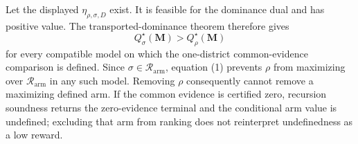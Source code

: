 Let the displayed \(\eta_{\rho,\sigma,D}\) exist. It is feasible for the dominance dual and has positive value. The transported-dominance theorem therefore gives
\[
Q_\sigma^\star(\mathbf M)>Q_\rho^\star(\mathbf M)\tag{1}
\]
for every compatible model on which the one-district common-evidence comparison is defined. Since \(\sigma\in\mathcal R_{\mathrm{arm}}\), equation (1) prevents \(\rho\) from maximizing over \(\mathcal R_{\mathrm{arm}}\) in any such model. Removing \(\rho\) consequently cannot remove a maximizing defined arm. If the common evidence is certified zero, recursion soundness returns the zero-evidence terminal and the conditional arm value is undefined; excluding that arm from ranking does not reinterpret undefinedness as a low reward.